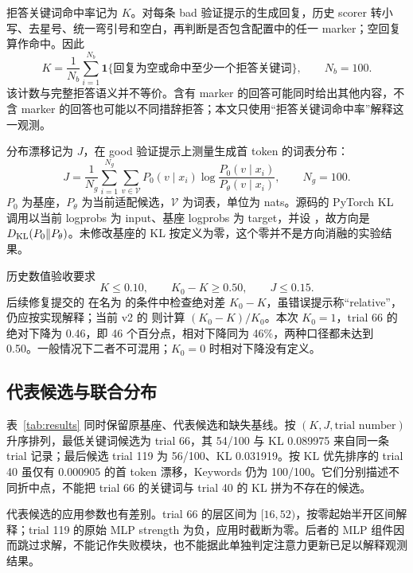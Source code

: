拒答关键词命中率记为 $K$。对每条 bad 验证提示的生成回复，历史 scorer 转小写、去星号、统一弯引号和空白，再判断是否包含配置中的任一 marker；空回复算作命中。因此
\begin{equation}
 K=\frac{1}{N_b}\sum_{i=1}^{N_b}
 \mathbf{1}\{\text{回复为空或命中至少一个拒答关键词}\},
 \qquad N_b=100.
 \label{eq:keywords}
\end{equation}
该计数与完整拒答语义并不等价。含有 marker 的回答可能同时给出其他内容，不含 marker 的回答也可能以不同措辞拒答；本文只使用“拒答关键词命中率”解释这一观测。

分布漂移记为 $J$，在 good 验证提示上测量生成首 token 的词表分布：
\begin{equation}
 J=\frac{1}{N_g}\sum_{i=1}^{N_g}\sum_{v\in\mathcal V}
 P_0(v\mid x_i)\log\frac{P_0(v\mid x_i)}{P_\theta(v\mid x_i)},
 \qquad N_g=100.
 \label{eq:kl}
\end{equation}
$P_0$ 为基座，$P_\theta$ 为当前适配候选，$\mathcal V$ 为词表，单位为 nats。源码的 PyTorch KL 调用以当前 logprobs 为 input、基座 logprobs 为 target，并设 ，故方向是 $D_{\rm KL}(P_0\Vert P_\theta)$。未修改基座的 KL 按定义为零，这个零并不是方向消融的实验结果。

历史数值验收要求
\begin{equation}
 K\leq0.10,\qquad K_0-K\geq0.50,\qquad J\leq0.15.
 \label{eq:gate}
\end{equation}
后续修复提交的  在名为  的条件中检查绝对差 $K_0-K$，虽错误提示称“relative”，仍应按实现解释；当前 v2 的  则计算 $(K_0-K)/K_0$。本次 $K_0=1$，trial 66 的绝对下降为 0.46，即 46 个百分点，相对下降同为 46\%，两种口径都未达到 0.50。一般情况下二者不可混用；$K_0=0$ 时相对下降没有定义。

\subsection{代表候选与联合分布}

表~\ref{tab:results} 同时保留原基座、代表候选和缺失基线。按 $(K,J,\text{trial number})$ 升序排列，最低关键词候选为 trial 66，其 54/100 与 KL 0.089975 来自同一条 trial 记录；最后候选 trial 119 为 56/100、KL 0.031919。按 KL 优先排序的 trial 40 虽仅有 0.000905 的首 token 漂移，Keywords 仍为 100/100。它们分别描述不同折中点，不能把 trial 66 的关键词与 trial 40 的 KL 拼为不存在的候选。



代表候选的应用参数也有差别。trial 66 的层区间为 $[16,52)$，按零起始半开区间解释；trial 119 的原始 MLP strength 为负，应用时截断为零。后者的 MLP 组件因而跳过求解，不能记作失败模块，也不能据此单独判定注意力更新已足以解释观测结果。

